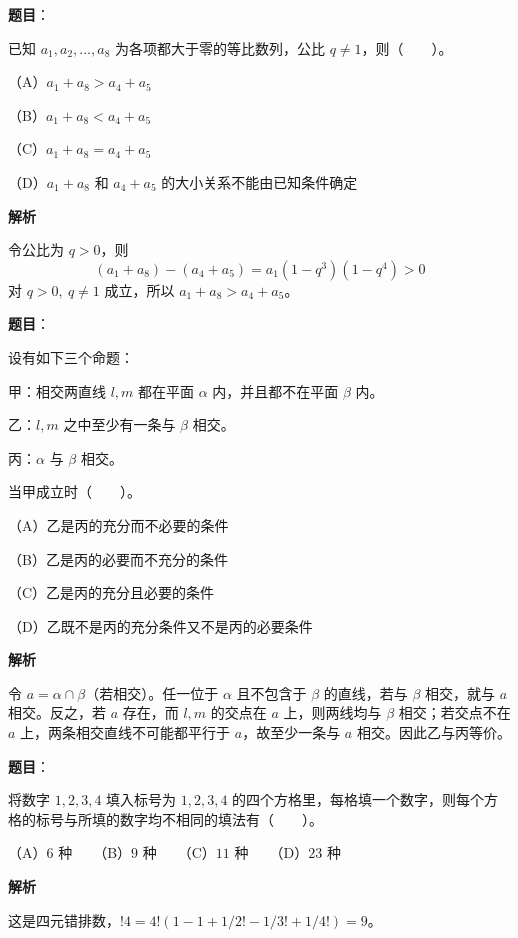 \begin{answer}

\textbf{题目}：

已知 $a_1,a_2,\ldots,a_8$ 为各项都大于零的等比数列，公比 $q\ne1$，则\mbox{（　　）}。

（A）$a_1+a_8>a_4+a_5$

（B）$a_1+a_8<a_4+a_5$

（C）$a_1+a_8=a_4+a_5$

（D）$a_1+a_8$ 和 $a_4+a_5$ 的大小关系不能由已知条件确定

\textbf{解析}

令公比为 $q>0$，则
\nopagebreak[4]
\[
(a_1+a_8)-(a_4+a_5)=a_1(1-q^3)(1-q^4)>0
\]
对 $q>0,\ q\ne1$ 成立，所以 $a_1+a_8>a_4+a_5$。


\end{answer}
\begin{answer}

\textbf{题目}：

设有如下三个命题：

甲：相交两直线 $l,m$ 都在平面 $\alpha$ 内，并且都不在平面 $\beta$ 内。

乙：$l,m$ 之中至少有一条与 $\beta$ 相交。

丙：$\alpha$ 与 $\beta$ 相交。

当甲成立时\mbox{（　　）}。

（A）乙是丙的充分而不必要的条件

（B）乙是丙的必要而不充分的条件

（C）乙是丙的充分且必要的条件

（D）乙既不是丙的充分条件又不是丙的必要条件

\textbf{解析}

令 $a=\alpha\cap\beta$（若相交）。任一位于 $\alpha$ 且不包含于 $\beta$ 的直线，若与 $\beta$ 相交，就与 $a$ 相交。反之，若 $a$ 存在，而 $l,m$ 的交点在 $a$ 上，则两线均与 $\beta$ 相交；若交点不在 $a$ 上，两条相交直线不可能都平行于 $a$，故至少一条与 $a$ 相交。因此乙与丙等价。


\end{answer}
\begin{answer}

\textbf{题目}：

将数字 $1,2,3,4$ 填入标号为 $1,2,3,4$ 的四个方格里，每格填一个数字，则每个方格的标号与所填的数字均不相同的填法有\mbox{（　　）}。

（A）$6$ 种　　（B）$9$ 种　　（C）$11$ 种　　（D）$23$ 种

\textbf{解析}

这是四元错排数，$!4=4!(1-1+1/2!-1/3!+1/4!)=9$。


\end{answer}
